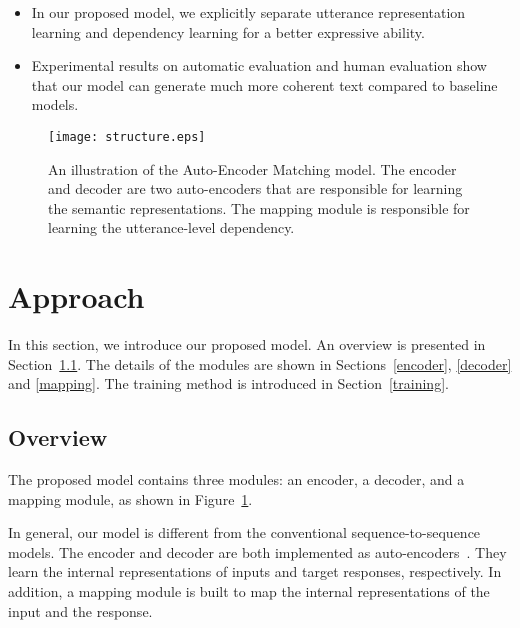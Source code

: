 \documentclass[11pt,a4paper]{article}
\begin{document}
\begin{CJK}{UTF8}{song}
\begin{itemize}
\item In our proposed model, we explicitly separate utterance representation learning and dependency learning for a better expressive ability.

\item Experimental results on automatic evaluation and human evaluation show that our model can generate much more coherent text compared to baseline models.


\end{itemize}

\begin{figure}[t] 
\centering
\texttt{[image: structure.eps]}
\caption{An illustration of the Auto-Encoder Matching model. The encoder and decoder are two auto-encoders that are responsible for learning the semantic representations. The mapping module is responsible for learning the utterance-level dependency. }
\label{structure} 
\end{figure} 


\section{Approach}
In this section, we introduce our proposed model. An overview is presented in Section~\ref{overview}. The details of the modules are shown in Sections~\ref{encoder}, \ref{decoder} and \ref{mapping}. The training method is introduced in Section~\ref{training}. 


\subsection{Overview}\label{overview}

The proposed model contains three modules: an encoder, a decoder, and a mapping module, as shown in Figure~\ref{structure}. 

In general, our model is different from the conventional sequence-to-sequence models. 
The encoder and decoder are both implemented as auto-encoders~\cite{DBLP:journals/jmlr/Baldi12}. They learn the internal representations of inputs and target responses, respectively.
In addition, a mapping module is built to map the internal representations of the input and the response.




\end{CJK}
\end{document}
